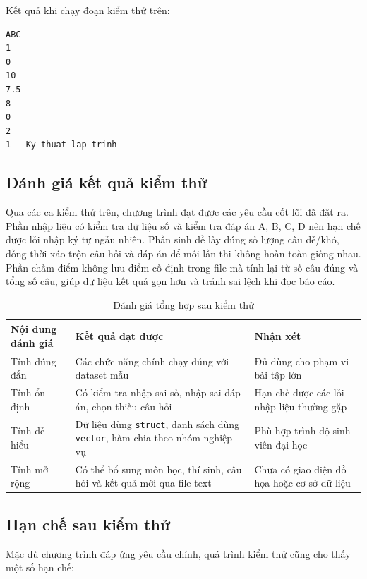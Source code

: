 \documentclass[12pt,a4paper]{article}
\begin{document}
Kết quả khi chạy đoạn kiểm thử trên:

\begin{lstlisting}[style=cppstyle, caption={Kết quả kiểm thử hàm tiện ích}]
ABC
1
0
10
7.5
8
0
2
1 - Ky thuat lap trinh
\end{lstlisting}

\subsection{Đánh giá kết quả kiểm thử}

Qua các ca kiểm thử trên, chương trình đạt được các yêu cầu cốt lõi đã đặt ra. Phần nhập liệu có kiểm tra dữ liệu số và kiểm tra đáp án A, B, C, D nên hạn chế được lỗi nhập ký tự ngẫu nhiên. Phần sinh đề lấy đúng số lượng câu dễ/khó, đồng thời xáo trộn câu hỏi và đáp án để mỗi lần thi không hoàn toàn giống nhau. Phần chấm điểm không lưu điểm cố định trong file mà tính lại từ số câu đúng và tổng số câu, giúp dữ liệu kết quả gọn hơn và tránh sai lệch khi đọc báo cáo.

\begin{table}[H]
\centering
\begin{tabular}{|p{4cm}|p{5cm}|p{5cm}|}
\hline
\textbf{Nội dung đánh giá} & \textbf{Kết quả đạt được} & \textbf{Nhận xét} \\
\hline
Tính đúng đắn & Các chức năng chính chạy đúng với dataset mẫu & Đủ dùng cho phạm vi bài tập lớn \\
\hline
Tính ổn định & Có kiểm tra nhập sai số, nhập sai đáp án, chọn thiếu câu hỏi & Hạn chế được các lỗi nhập liệu thường gặp \\
\hline
Tính dễ hiểu & Dữ liệu dùng \texttt{struct}, danh sách dùng \texttt{vector}, hàm chia theo nhóm nghiệp vụ & Phù hợp trình độ sinh viên đại học \\
\hline
Tính mở rộng & Có thể bổ sung môn học, thí sinh, câu hỏi và kết quả mới qua file text & Chưa có giao diện đồ họa hoặc cơ sở dữ liệu \\
\hline
\end{tabular}
\caption{Đánh giá tổng hợp sau kiểm thử}
\end{table}

\subsection{Hạn chế sau kiểm thử}

Mặc dù chương trình đáp ứng yêu cầu chính, quá trình kiểm thử cũng cho thấy một số hạn chế:
\end{document}
